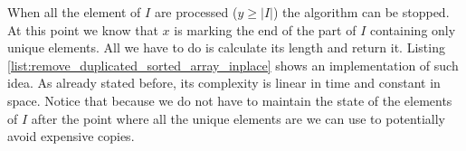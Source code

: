 When all the element of $I$ are processed ($y \geq |I|$) the algorithm can be stopped. At this point
we know that $x$ is marking the end of the part of $I$ containing only unique elements. All we have
to do is calculate its length and return it. Listing
\ref{list:remove_duplicated_sorted_array_inplace} shows an implementation of such idea. As already
stated before, its complexity is linear in time and constant in space.
Notice that because we do not have to maintain the state of the elements of $I$ after the point where all the unique elements are
we can use  to potentially avoid expensive copies.

\begin{minipage}{\linewidth}
	
\end{minipage}



